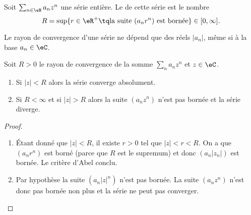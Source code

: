 \begin{definition}
    Soit \( \sum_{n\in \eN}a_nz^n\) une série entière. Le  de cette série est le nombre
    \begin{equation}
        R=\sup\{ r\in \eR^+\tq \text{la suite \((a_nr^n)\) est bornée} \}\in\mathopen[ 0 , \infty \mathclose].
    \end{equation}
\end{definition}
Le rayon de convergence d'une série ne dépend que des réels \( | a_n |\), même si à la base \( a_n\in \eC\).

\begin{theorem}
    Soit \( R>0\) le rayon de convergence de la somme \( \sum_na_nz^n\) et \( z\in \eC\).
    \begin{enumerate}
        \item
            Si \( | z |<R\) alors la série converge absolument.
        \item
            Si \( R<\infty\) et si \( | z |>R\) alors la suite \( (a_nz^n)\) n'est pas bornée et la série diverge.
    \end{enumerate}
\end{theorem}

\begin{proof}
    \begin{enumerate}
        \item
            Étant donné que \( | z |<R\), il existe \( r>0\) tel que \( | z |<r<R\). On a que \( (a_nr^n)\) est borné (parce que \( R\) est le supremum) et donc \( (a_n| z_n |)\) est bornée. Le critère d'Abel conclu.
        \item
            Par hypothèse la suite \( (a_n| z |^n)\) n'est pas bornée. La suite \( (a_nz^n)\) n'est donc pas bornée non plus et la série ne peut pas converger.
    \end{enumerate}
\end{proof}
